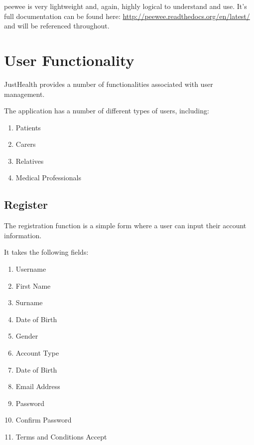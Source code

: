 \documentclass[letterpaper,10pt,english]{sphinxmanual}
\begin{document}
peewee is very lightweight and, again, highly logical to understand and use. It's full documentation can be found here: \href{http://peewee.readthedocs.org/en/latest/}{http://peewee.readthedocs.org/en/latest/} and will be referenced throughout.


\chapter{User Functionality}
\label{docs/users::doc}\label{docs/users:user-functionality}
JustHealth provides a number of functionalities associated with user management.

The application has a number of different types of users, including:
\begin{enumerate}
\item {} 
Patients

\item {} 
Carers

\item {} 
Relatives

\item {} 
Medical Professionals

\end{enumerate}


\section{Register}
\label{docs/users:register}
The registration function is a simple form where a user can input their account information.

It takes the following fields:
\begin{enumerate}
\item {} 
Username

\item {} 
First Name

\item {} 
Surname

\item {} 
Date of Birth

\item {} 
Gender

\item {} 
Account Type

\item {} 
Date of Birth

\item {} 
Email Address

\item {} 
Password

\item {} 
Confirm Password

\item {} 
Terms and Conditions Accept

\end{enumerate}
\end{document}
